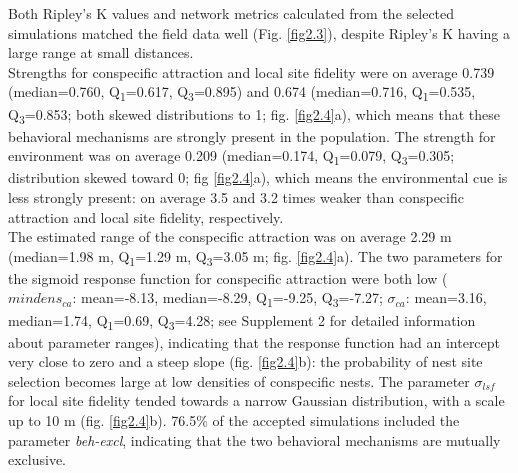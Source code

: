 \documentclass[10pt, twoside]{book} %
\begin{document}
	Both Ripley's K values and network metrics calculated from the selected simulations matched the field data well (Fig. \ref{fig2.3}), despite Ripley's K having a large range at small distances.\\
	
	Strengths for conspecific attraction and local site fidelity were on average 0.739 (median=0.760, Q\textsubscript{1}=0.617, Q\textsubscript{3}=0.895) and 0.674 (median=0.716, Q\textsubscript{1}=0.535, Q\textsubscript{3}=0.853; both skewed distributions to 1; fig. \ref{fig2.4}a), which means that these behavioral mechanisms are strongly present in the population. The strength for environment was on average 0.209 (median=0.174, Q\textsubscript{1}=0.079, Q\textsubscript{3}=0.305; distribution skewed toward 0; fig \ref{fig2.4}a), which means the environmental cue is less strongly present: on average 3.5 and 3.2 times weaker than conspecific attraction and local site fidelity, respectively.\\
	
	The estimated range of the conspecific attraction was on average 2.29 m (median=1.98 m, Q\textsubscript{1}=1.29 m, Q\textsubscript{3}=3.05 m; fig. \ref{fig2.4}a). The two parameters for the sigmoid response function for conspecific attraction were both low ($mindens_{ca}$: mean=-8.13, median=-8.29, Q\textsubscript{1}=-9.25, Q\textsubscript{3}=-7.27; $\sigma_{ca}$: mean=3.16, median=1.74, Q\textsubscript{1}=0.69, Q\textsubscript{3}=4.28; see Supplement 2 for detailed information about parameter ranges), indicating that the response function had an intercept very close to zero and a steep slope (fig. \ref{fig2.4}b): the probability of nest site selection becomes large at low densities of conspecific nests. The parameter $\sigma_{lsf}$ for local site fidelity tended towards a narrow Gaussian distribution, with a scale up to 10 m (fig. \ref{fig2.4}b). 76.5$\%$ of the accepted simulations included the parameter \textit{beh-excl}, indicating that the two behavioral mechanisms are mutually exclusive.\\
	
\end{document}
